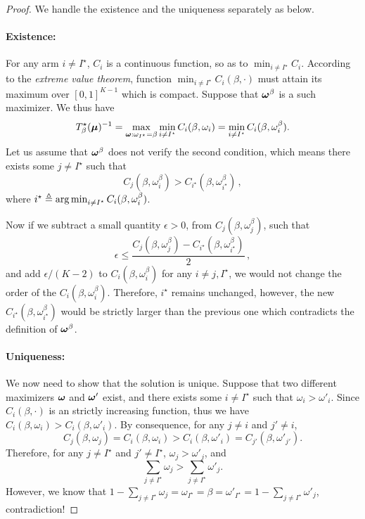 \begin{proof}
We handle the existence and the uniqueness separately as below.

\paragraph{Existence:} For any arm $i\neq I^\star$, $C_i$ is a continuous function, so as to $\min_{i\neq I^\star} C_i$. According to the \emph{extreme value theorem}, function $\min_{i\neq I^\star} C_i(\beta,\cdot)$ must attain its maximum over $[0,1]^{K-1}$ which is compact. Suppose that ${\boldsymbol \omega}^\beta$ is a such maximizer. We thus have
\[
    T_{\beta}^\star({\boldsymbol \mu})^{-1} = \max_{{\boldsymbol \omega}:\omega_{I^\star}=\beta}\min_{i\neq I^\star} C_i(\beta,\omega_i) = \min_{i\neq I^\star} C_i(\beta,\omega_i^\beta).
\]
Let us assume that ${\boldsymbol \omega}^\beta$ does not verify the second condition, which means there exists some $j\neq I^\star$ such that
\[
    C_j(\beta,\omega_i^\beta) > C_{i^\star}(\beta,\omega_{i^\star}^\beta)\,,
\]
where $i^\star \triangleq \operatorname*{arg\,min}_{i\neq I^\star} C_i(\beta,\omega_i^\beta)$.

Now if we subtract a small quantity $\epsilon>0$, from $C_j(\beta,\omega_j^\beta)$, such that
\[
    \epsilon \leq \frac{C_j(\beta,\omega_j^\beta)-C_{i^\star}(\beta,\omega_{i^\star}^\beta)}{2}\,,
\]
and add $\epsilon/(K-2)$ to $C_i(\beta,\omega_i^\beta)$ for any $i\neq j,I^\star$, we would not change the order of the $C_i(\beta,\omega_i^\beta)$. Therefore, $i^\star$ remains unchanged, however, the new $C_{i^\star}(\beta,\omega_{i^\star}^\beta)$ would be strictly larger than the previous one which contradicts the definition of ${\boldsymbol \omega}^\beta$.

\paragraph{Uniqueness:} 
We now need to show that the solution is unique. Suppose that two different maximizers ${\boldsymbol \omega}$ and ${\boldsymbol \omega}'$ exist, and there exists some $i\neq I^\star$ such that $\omega_i > \omega'_i$. Since $C_i(\beta,\cdot)$ is an strictly increasing function, thus we have $C_i(\beta,\omega_i)>C_i(\beta,\omega'_i)$. By consequence, for any $j\neq i$ and $j'\neq i$,
    \[
        C_j(\beta,\omega_j) = C_i(\beta,\omega_i) > C_i(\beta,\omega'_i) = C_{j'}(\beta,\omega'_{j'}).
    \]
Therefore, for any $j\neq I^\star$ and $j'\neq I^\star$, $\omega_j > \omega'_j$, and
    \[
        \sum_{j\neq I^\star} \omega_j > \sum_{j\neq I^\star} \omega'_j.
    \]
However, we know that $1-\sum_{j\neq I^\star} \omega_j = \omega_{I^\star} =  \beta = \omega'_{I^\star} = 1-\sum_{j\neq I^\star} \omega'_j$, contradiction!

\end{proof}

